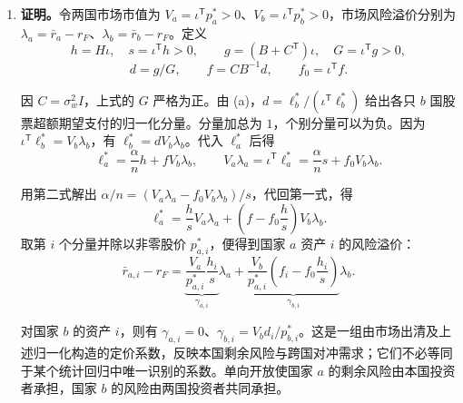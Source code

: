 \begin{solution}[blank-type=manual,blank-vsep=9\baselineskip]
\begin{enumerate}[label=(\alph*)]
与上一题双向开放相比，$\ell_b^*$ 不变，所以 $b$ 国股价不变。$a$ 国的超额期望支付向量增加了 $\alpha(1/n-1/L)H\iota$。由于 $\iota^{\mathsf T}H\iota>0$，这一增量加总为正，$a$ 国股票总市值下降。个股价格的变化方向则取决于 $H\iota$ 的对应分量。

无风险投资仍由预算余额决定。两国投资者分别从初始财富中扣除 $(p_a^*)^{\mathsf T}x^*+(p_b^*)^{\mathsf T}y^*$ 和 $(p_b^*)^{\mathsf T}t^*$。由两国股票出清，合计扣除的正是两国股票总市值，因此在沿用上一题的初始资产禀赋条件时，无风险资产也出清。

\item \textbf{证明。}令两国市场市值为 $V_a=\iota^{\mathsf T}p_a^*>0$、$V_b=\iota^{\mathsf T}p_b^*>0$，市场风险溢价分别为 $\lambda_a=\bar r_a-r_F$、$\lambda_b=\bar r_b-r_F$。定义
\[
 h=H\iota,\quad s=\iota^{\mathsf T}h>0,\qquad
 g=(B+C^{\mathsf T})\iota,\quad G=\iota^{\mathsf T}g>0,
\]
\[
 d=g/G,\qquad f=CB^{-1}d,\qquad f_0=\iota^{\mathsf T}f.
\]

因 $C=\sigma_w^2I$，上式的 $G$ 严格为正。由 (a)，$d=\ell_b^*/(\iota^{\mathsf T}\ell_b^*)$ 给出各只 $b$ 国股票超额期望支付的归一化分量。分量加总为 $1$，个别分量可以为负。因为 $\iota^{\mathsf T}\ell_b^*=V_b\lambda_b$，有 $\ell_b^*=dV_b\lambda_b$。代入 $\ell_a^*$ 后得
\[
 \ell_a^*=\frac\alpha n h+fV_b\lambda_b,\qquad
 V_a\lambda_a=\iota^{\mathsf T}\ell_a^*
 =\frac\alpha n s+f_0V_b\lambda_b.
\]

用第二式解出 $\alpha/n=(V_a\lambda_a-f_0V_b\lambda_b)/s$，代回第一式，得
\[
 \ell_a^*=\frac{h}{s}V_a\lambda_a
             +\left(f-f_0\frac{h}{s}\right)V_b\lambda_b.
\]
取第 $i$ 个分量并除以非零股价 $p_{a,i}^*$，便得到国家 $a$ 资产 $i$ 的风险溢价：
\[
 \bar r_{a,i}-r_F
 =\underbrace{\frac{V_a}{p_{a,i}^*}\frac{h_i}{s}}_{\gamma_{a,i}}\lambda_a
 +\underbrace{\frac{V_b}{p_{a,i}^*}\left(f_i-f_0\frac{h_i}{s}\right)}_{\gamma_{b,i}}\lambda_b.
\]

对国家 $b$ 的资产 $i$，则有 $\gamma_{a,i}=0$、$\gamma_{b,i}=V_bd_i/p_{b,i}^*$。这是一组由市场出清及上述归一化构造的定价系数，反映本国剩余风险与跨国对冲需求；它们不必等同于某个统计回归中唯一识别的系数。单向开放使国家 $a$ 的剩余风险由本国投资者承担，国家 $b$ 的风险由两国投资者共同承担。\qedhere
\end{enumerate}
\end{solution}

